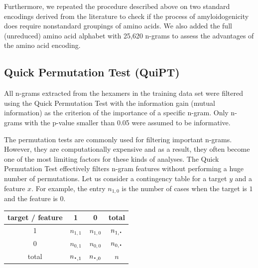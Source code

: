 \documentclass[a4,center,fleqn]{NAR}
\newcommand*{\bigcdot}{\raisebox{-0.25ex}{\scalebox{1.5}{$\cdot$}}}
\begin{document}
  Furthermore, we repeated the procedure described above on two standard encodings 
derived from the literature to check if the process of amyloidogenicity does 
require nonstandard groupings of amino acids. We also added the full (unreduced) amino 
acid alphabet with 25,620 n-grams to assess the advantages of the amino acid encoding.

%
%
%
%

\subsection{Quick Permutation Test (QuiPT)}

  All n-grams extracted from the hexamers in the training data set were 
filtered using the Quick Permutation Test with the information gain 
(mutual information) as the criterion of the importance of a specific n-gram. 
Only n-grams with the p-value smaller than 0.05 were assumed to be informative.

The permutation tests are commonly used for filtering important n-grams. 
However, they are computationally expensive and as a result, they often become 
one of the most limiting factors for these kinds of analyses. 
The Quick Permutation Test effectively filters n-gram features without performing 
a huge number of permutations. Let us consider a contingency table for a target 
$y$ and a feature $x$. For example, the entry $n_{1,0}$ is the number of cases 
when the target is $1$ and the feature is $0$.

\begin{center}
\begin{tabular}{ | c || c | c | c | }
  \hline			
  target / feature & 1 & 0 & total\\ \hline
 1 & $n_{1,1}$ & $n_{1,0}$ & $n_{1,\bigcdot}$ \\
 0 & $n_{0,1}$ & $n_{0,0}$ & $n_{0,\bigcdot}$ \\ \hline
 total & $n_{\bigcdot,1}$ & $n_{\bigcdot,0}$ & $n$ \\
  \hline  
\end{tabular} 
\end{center}
\end{document}
